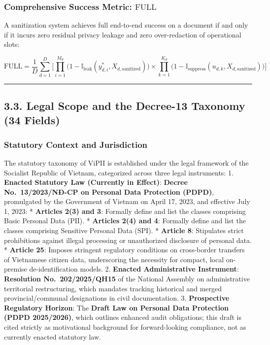\documentclass[
]{article}
\begin{document}
\subsubsection{\texorpdfstring{Comprehensive Success Metric:
\(\text{FULL}\)}{Comprehensive Success Metric: \textbackslash text\{FULL\}}}\label{comprehensive-success-metric-textfull}

A sanitization system achieves full end-to-end success on a document if
and only if it incurs zero residual privacy leakage and zero
over-redaction of operational slots:

\[\text{FULL} = \frac{1}{D} \sum_{d=1}^D \Biggl[ \prod_{i=1}^{M_d} \bigl(1 - \mathbb{I}_{\text{leak}}(y_{d,i}^*, X_{d,\text{sanitized}})\bigr) \times \prod_{k=1}^{K_d} \bigl(1 - \mathbb{I}_{\text{suppress}}(u_{d,k}, X_{d,\text{sanitized}})\bigr) \Biggr]\]

\begin{center}\rule{0.5\linewidth}{0.5pt}\end{center}

\subsection{3.3. Legal Scope and the Decree-13 Taxonomy (34
Fields)}\label{legal-scope-and-the-decree-13-taxonomy-34-fields}

\subsubsection{Statutory Context and
Jurisdiction}\label{statutory-context-and-jurisdiction}

The statutory taxonomy of ViPII is established under the legal framework
of the Socialist Republic of Vietnam, categorized across three legal
instruments: 1. \textbf{Enacted Statutory Law (Currently in Effect)}:
\textbf{Decree No.~13/2023/NĐ-CP on Personal Data Protection (PDPD)},
promulgated by the Government of Vietnam on April 17, 2023, and
effective July 1, 2023: * \textbf{Articles 2(3) and 3}: Formally define
and list the classes comprising Basic Personal Data (\(\text{PII}\)). *
\textbf{Articles 2(4) and 4}: Formally define and list the classes
comprising Sensitive Personal Data (\(\text{SPI}\)). * \textbf{Article
8}: Stipulates strict prohibitions against illegal processing or
unauthorized disclosure of personal data. * \textbf{Article 25}: Imposes
stringent regulatory conditions on cross-border transfers of Vietnamese
citizen data, underscoring the necessity for compact, local on-premise
de-identification models. 2. \textbf{Enacted Administrative Instrument}:
\textbf{Resolution No.~202/2025/QH15} of the National Assembly on
administrative territorial restructuring, which mandates tracking
historical and merged provincial/communal designations in civil
documentation. 3. \textbf{Prospective Regulatory Horizon}: The
\textbf{Draft Law on Personal Data Protection (PDPD 2025/2026)}, which
outlines enhanced audit obligations; this draft is cited strictly as
motivational background for forward-looking compliance, not as currently
enacted statutory law.
\end{document}
